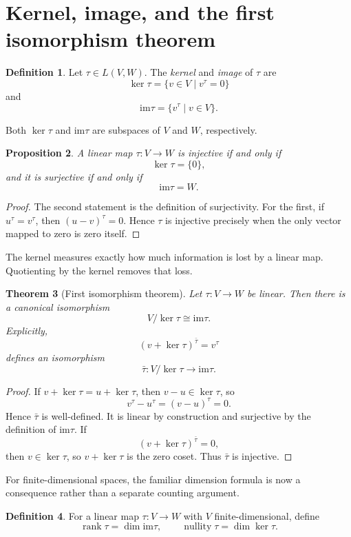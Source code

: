 \documentclass{amsbook}
\newtheorem{theorem}{Theorem}[chapter]
\newtheorem{proposition}[theorem]{Proposition}
\theoremstyle{definition}
\newtheorem{definition}[theorem]{Definition}
\theoremstyle{remark}
\newcommand{\im}{\mathrm{im}}
\numberwithin{section}{chapter}
\numberwithin{equation}{chapter}
\begin{document}
\section{Kernel, image, and the first isomorphism theorem}

\begin{definition}
Let $\tau\in L(V,W)$. The \emph{kernel} and \emph{image} of $\tau$ are
\[
\ker\tau=\{v\in V\mid v^\tau=0\}
\]
and
\[
\im\tau=\{v^\tau\mid v\in V\}.
\]
\end{definition}

Both $\ker\tau$ and $\im\tau$ are subspaces of $V$ and $W$, respectively.

\begin{proposition}\label{prop:inj-surj}
A linear map $\tau\colon V\to W$ is injective if and only if
\[
\ker\tau=\{0\},
\]
and it is surjective if and only if
\[
\im\tau=W.
\]
\end{proposition}

\begin{proof}
The second statement is the definition of surjectivity. For the first, if $u^\tau=v^\tau$, then $(u-v)^\tau=0$. Hence $\tau$ is injective precisely when the only vector mapped to zero is zero itself.
\end{proof}

The kernel measures exactly how much information is lost by a linear map. Quotienting by the kernel removes that loss.

\begin{theorem}[First isomorphism theorem]\label{thm:first-isomorphism}
Let $\tau\colon V\to W$ be linear. Then there is a canonical isomorphism
\[
V/\ker\tau\cong\im\tau.
\]
Explicitly,
\[
(v+\ker\tau)^{\bar\tau}=v^\tau
\]
defines an isomorphism
\[
\bar\tau\colon V/\ker\tau\longrightarrow\im\tau.
\]
\end{theorem}

\begin{proof}
If $v+\ker\tau=u+\ker\tau$, then $v-u\in\ker\tau$, so
\[
v^\tau-u^\tau=(v-u)^\tau=0.
\]
Hence $\bar\tau$ is well-defined. It is linear by construction and surjective by the definition of $\im\tau$. If
\[
(v+\ker\tau)^{\bar\tau}=0,
\]
then $v\in\ker\tau$, so $v+\ker\tau$ is the zero coset. Thus $\bar\tau$ is injective.
\end{proof}

For finite-dimensional spaces, the familiar dimension formula is now a consequence rather than a separate counting argument.

\begin{definition}
For a linear map $\tau\colon V\to W$ with $V$ finite-dimensional, define
\[
\operatorname{rank}\tau=\dim\im\tau,
\qquad
\operatorname{nullity}\tau=\dim\ker\tau.
\]
\end{definition}
\end{document}
